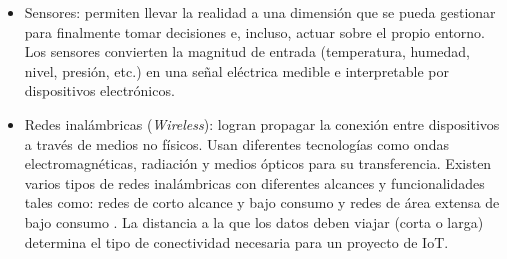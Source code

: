 \begin{itemize}
\item Sensores: permiten llevar la realidad a una dimensión que se pueda gestionar para finalmente tomar decisiones e, incluso, actuar sobre el propio entorno. Los sensores convierten la magnitud de entrada (temperatura, humedad, nivel, presión, etc.) en una señal eléctrica medible e interpretable por dispositivos electrónicos.

\item Redes inalámbricas (\emph{Wireless}): logran propagar la conexión entre dispositivos a través de medios no físicos. Usan diferentes tecnologías como ondas electromagnéticas, radiación y medios ópticos para su transferencia. Existen varios tipos de redes inalámbricas con diferentes alcances y funcionalidades tales como: redes de corto alcance y bajo consumo y redes de área extensa de bajo consumo \citep{WEBSITE:15}. La distancia a la que los datos deben viajar (corta o larga) determina el tipo de conectividad necesaria para un proyecto de IoT.

\end{itemize}








